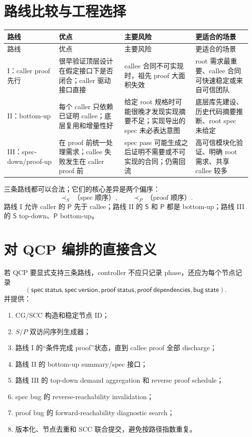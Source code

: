 \documentclass[UTF8,a4paper,11pt]{ctexart}
\newcommand{\SpecOp}{\mathsf{S}}
\newcommand{\ProofOp}{\mathsf{P}}
\begin{document}
\section{路线比较与工程选择}

\begin{longtable}{>{\raggedright\arraybackslash}p{}
                  >{\raggedright\arraybackslash}p{}
                  >{\raggedright\arraybackslash}p{}
                  >{\raggedright\arraybackslash}p{}}
\toprule
路线 & 优点 & 主要风险 & 更适合的场景\\
\midrule
\endfirsthead
\toprule
路线 & 优点 & 主要风险 & 更适合的场景\\
\midrule
\endhead
I：caller proof 先行
& 很早验证顶层设计在假定接口下是否闭合；caller 驱动接口直接
& callee 合同不可实现时，祖先 proof 大面积失效
& root 需求最重要、callee 合同可快速稳定或来自可信团队\\
\addlinespace
II：bottom-up
& 每个 caller 只依赖已证明 callee；底层复用和增量性好
& 给定 root 规格时可能很晚才发现实现摘要不足；实现导出的 spec 未必表达意图
& 底层库先建设、历史代码摘要推断、root spec 未给定\\
\addlinespace
III：spec-down/proof-up
& 在 proof 前统一处理需求；callee 失败发生在 caller proof 前
& spec pass 可能生成之后证明不需要或不可实现的合同；仍需回流
& 高可信模块化验证、明确 root 需求、共享 callee 较多\\
\bottomrule
\end{longtable}

三条路线都可以合法；它们的核心差异是两个偏序：
\[
  \prec_S\;\text{（spec 顺序）},\qquad
  \prec_P\;\text{（proof 顺序）}.
\]
路线 I 允许 caller 的 $\ProofOp$ 先于 callee；路线 II 的 $\SpecOp$ 和 $\ProofOp$ 都是 bottom-up；路线 III 的 $\SpecOp$ top-down、$\ProofOp$ bottom-up。

\section{对 QCP 编排的直接含义}

若 QCP 要显式支持三条路线，controller 不应只记录 phase，还应为每个节点记录
\[
  (\mathsf{spec\ status},\mathsf{spec\ version},
    \mathsf{proof\ status},\mathsf{proof\ dependencies},
    \mathsf{bug\ state}).
\]
并提供：
\begin{enumerate}
  \item CG/SCC 构造和稳定节点 ID；
  \item $S/P$ 双访问序列生成器；
  \item 路线 I 的“条件完成 proof”状态，直到 callee proof 全部 discharge；
  \item 路线 II 的 bottom-up summary/spec 接口；
  \item 路线 III 的 top-down demand aggregation 和 reverse proof schedule；
  \item spec bug 的 reverse-reachability invalidation；
  \item proof bug 的 forward-reachability diagnostic search；
  \item 版本化、节点去重和 SCC 联合提交，避免按路径指数重复。
\end{enumerate}
\end{document}
